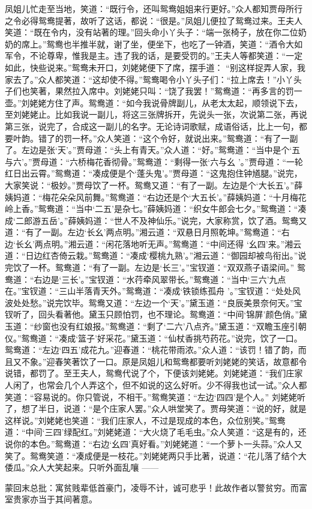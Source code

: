 \begin{parag}
    凤姐儿忙走至当地，笑道：“既行令，还叫鸳鸯姐姐来行更好。”众人都知贾母所行之令必得鸳鸯提著，故听了这话，都说：“很是。”凤姐儿便拉了鸳鸯过来。王夫人笑道：“既在令内，没有站著的理。”回头命小丫头子：“端一张椅子，放在你二位奶奶的席上。”鸳鸯也半推半就，谢了坐，便坐下，也吃了一钟酒，笑道：“酒令大如军令，不论尊卑，惟我是主。违了我的话，是要受罚的。”王夫人等都笑道：“一定如此，快些说来。”鸳鸯未开口，刘姥姥便下了席，摆手道： “别这样捉弄人家，我家去了。”众人都笑道：“这却使不得。”鸳鸯喝令小丫头子们：“拉上席去！”小丫头子们也笑著，果然拉入席中。刘姥姥只叫：“饶了我罢！”鸳鸯道：“再多言的罚一壶。”刘姥姥方住了声。鸳鸯道：“如今我说骨牌副儿，从老太太起，顺领说下去，至刘姥姥止。比如我说一副儿，将这三张牌拆开，先说头一张，次说第二张，再说第三张，说完了，合成这一副儿的名字。无论诗词歌赋，成语俗话，比上一句，都要叶韵。错了的罚一杯。”众人笑道：“这个令好，就说出来。”鸳鸯道：“有了一副了。左边是张‘天’。”贾母道：“头上有青天。”众人道：“好。”鸳鸯道：“当中是个‘五与六’。”贾母道：“六桥梅花香彻骨。”鸳鸯道：“剩得一张‘六与幺 ’。”贾母道：“一轮红日出云霄。”鸳鸯道：“凑成便是个‘蓬头鬼’。”贾母道：“这鬼抱住钟馗腿。”说完，大家笑说：“极妙。”贾母饮了一杯。鸳鸯又道：“有了一副。左边是个‘大长五’。”薛姨妈道：“梅花朵朵风前舞。”鸳鸯道：“右边还是个‘大五长’。”薛姨妈道：“十月梅花岭上香。”鸳鸯道：“当中‘二五’是杂七。”薛姨妈道：“织女牛郎会七夕。”鸳鸯道：“凑成‘二郎游五岳’。”薛姨妈道：“世人不及神仙乐。”说完，大家称赏，饮了酒。鸳鸯又道：“有了一副。左边‘长幺’两点明。”湘云道：“双悬日月照乾坤。”鸳鸯道：“右边‘长幺’两点明。”湘云道：“闲花落地听无声。”鸳鸯道：“中间还得 ‘幺四’来。”湘云道：“日边红杏倚云栽。”鸳鸯道：“凑成‘樱桃九熟’。”湘云道：“御园却被鸟衔出。”说完饮了一杯。鸳鸯道：“有了一副。左边是‘长三’。”宝钗道：“双双燕子语梁间。” 鸳鸯道：“右边是‘三长’。”宝钗道：“水荇牵风翠带长。”鸳鸯道：“当中‘三六’九点在。”宝钗道：“三山半落青天外。”鸳鸯道：“凑成‘铁锁练孤舟 ’。”宝钗道：“处处风波处处愁。”说完饮毕。鸳鸯又道：“左边一个‘天’。”黛玉道：“良辰美景奈何天。”宝钗听了，回头看著他。黛玉只顾怕罚，也不理论。鸳鸯道：“中间‘锦屏’颜色俏。”黛玉道：“纱窗也没有红娘报。”鸳鸯道：“剩了‘二六’八点齐。”黛玉道：“双瞻玉座引朝仪。”鸳鸯道：“凑成‘篮子’好采花。”黛玉道：“仙杖香挑芍药花。”说完，饮了一口。鸳鸯道：“左边‘四五’成花九。”迎春道：“桃花带雨浓。”众人道：“该罚！错了韵，而且又不象。”迎春笑著饮了一口。原是凤姐儿和鸳鸯都要听刘姥姥的笑话，故意都令说错，都罚了。至王夫人，鸳鸯代说了个，下便该刘姥姥。刘姥姥道：“我们庄家人闲了，也常会几个人弄这个，但不如说的这么好听。少不得我也试一试。”众人都笑道：“容易说的。你只管说，不相干。”鸳鸯笑道：“左边‘四四’是个人。” 刘姥姥听了，想了半日，说道：“是个庄家人罢。”众人哄堂笑了。贾母笑道：“说的好，就是这样说。”刘姥姥也笑道：“我们庄家人，不过是现成的本色，众位别笑。”鸳鸯道：“中间‘三四’绿配红。”刘姥姥道：“大火烧了毛毛虫。”众人笑道：“这是有的，还说你的本色。”鸳鸯道：“右边‘幺四’真好看。”刘姥姥道：“一个萝卜一头蒜。”众人又笑了。鸳鸯笑道：“凑成便是一枝花。”刘姥姥两只手比著，说道：“花儿落了结个大倭瓜。”众人大笑起来。只听外面乱嚷 ——
\end{parag}


\begin{parag}
    \begin{note}蒙回末总批：寓贫贱辈低首豪门，凌辱不计，诚可悲乎！此故作者以警贫穷。而富室贵家亦当于其间著意。\end{note}
\end{parag}

